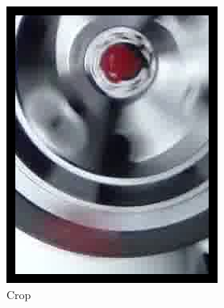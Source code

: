 \begin{figure}
\begin{subfigure}{0.25\textwidth}
\includegraphics[width=\textwidth]{img/motan_1}
\caption{Crop}
\label{fig:motcrop}
\end{subfigure}%
\begin{subfigure}{0.25\textwidth}

\end{subfigure}
\end{figure}
